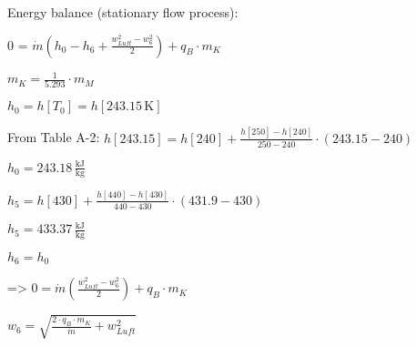 Energy balance (stationary flow process):  

0 = \( \dot{m} \left( h_0 - h_6 + \frac{w_{Luft}^2 - w_6^2}{2} \right) + q_B \cdot m_K \)  

\( m_K = \frac{1}{5.293} \cdot m_M \)  

\( h_0 = h[T_0] = h[243.15 \, \text{K}] \)  

From Table A-2:  
\( h[243.15] = h[240] + \frac{h[250] - h[240]}{250 - 240} \cdot (243.15 - 240) \)  

\( h_0 = 243.18 \, \frac{\text{kJ}}{\text{kg}} \)  

\( h_5 = h[430] + \frac{h[440] - h[430]}{440 - 430} \cdot (431.9 - 430) \)  

\( h_5 = 433.37 \, \frac{\text{kJ}}{\text{kg}} \)  

\( h_6 = h_0 \)  

=> \( 0 = \dot{m} \left( \frac{w_{Luft}^2 - w_6^2}{2} \right) + q_B \cdot m_K \)  

\( w_6 = \sqrt{\frac{2 \cdot q_B \cdot m_K}{\dot{m}} + w_{Luft}^2} \)